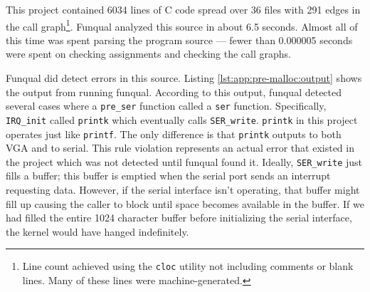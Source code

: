 This project contained 6034 lines of C code spread over 36 files with 291 edges in the call graph\footnote{Line count achieved using the \lstinline{cloc} utility not including comments or blank lines.  Many of these lines were machine-generated.}.  Funqual analyzed this source in about 6.5 seconds.  Almost all of this time was spent parsing the program source --- fewer than 0.000005 seconds were spent on checking assignments and checking the call graphs.  

Funqual did detect errors in this source.  Listing \ref{lst:app:pre-malloc:output} shows the output from running funqual.  According to this output, funqual detected several cases where a \lstinline{pre_ser} function called a \lstinline{ser} function.  Specifically, \lstinline{IRQ_init} called \lstinline{printk} which eventually calls \lstinline{SER_write}.  \lstinline{printk} in this project operates just like \lstinline{printf}.  The only difference is that \lstinline{printk} outputs to both VGA and to serial.  This rule violation represents an actual error that existed in the project which was not detected until funqual found it.  Ideally, \lstinline{SER_write} just fills a buffer; this buffer is emptied when the serial port sends an interrupt requesting data.  However, if the serial interface isn't operating, that buffer might fill up causing the caller to block until space becomes available in the buffer.  If we had filled the entire 1024 character buffer before initializing the serial interface, the kernel would have hanged indefinitely.

